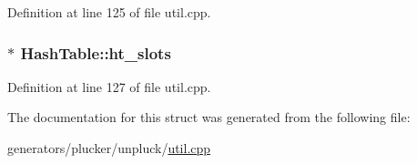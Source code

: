 Definition at line 125 of file util.\+cpp.

\hypertarget{structHashTable_ab8cedc8a27628fcf828d19c222cb641b}{
\subsubsection[{ht\+\_\+slots}]{$\ast$ Hash\+Table\+::ht\+\_\+slots}}\label{structHashTable_ab8cedc8a27628fcf828d19c222cb641b}


Definition at line 127 of file util.\+cpp.



The documentation for this struct was generated from the following file\+:\begin{DoxyCompactItemize}
\item 
generators/plucker/unpluck/\hyperlink{plucker_2unpluck_2util_8cpp}{util.\+cpp}\end{DoxyCompactItemize}
